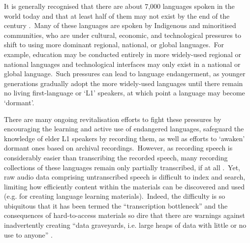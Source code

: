 \documentclass[main.tex]{subfiles}
\begin{document}
It is generally recognised that there are about 7,000 languages spoken in the world today and that at least half of them may not exist by the end of the century \parencite{austin2011cambridge}.~Many of these languages are spoken by Indigenous and minoritised communities, who are under cultural, economic, and technological pressures to shift to using more dominant regional, national, or global languages.~For example, education may be conducted entirely in more widely-used regional or national languages and technological interfaces may only exist in a national or global language.~Such pressures can lead to language endangerment, as younger generations gradually adopt the more widely-used languages until there remain no living first-language or `L1' speakers, at which point a language may become `dormant'.

There are many ongoing revitalisation efforts to fight these pressures by encouraging the learning and active use of endangered languages, safeguard the knowledge of elder L1 speakers by recording them, as well as efforts to ‘awaken’ dormant ones based on archival recordings.~However, as recording speech is considerably easier than transcribing the recorded speech, many recording collections of these languages remain only partially transcribed, if at all \parencite{cox2019taking}.~Yet, raw audio data comprising untranscribed speech is difficult to index and search, limiting how efficiently content within the materials can be discovered and used (e.g. for creating language learning materials).~Indeed, the difficulty is so ubiquitous that it has been termed the ``transcription bottleneck'' \parencite[]{seifart2018language,foley2018building,cox2019taking} and the consequences of hard-to-access materials so dire that there are warnings against inadvertently creating ``data graveyards, i.e. large heaps of data with little or no use to anyone'' \parencite[][p. 4]{himmelmann2006language}.
\end{document}
